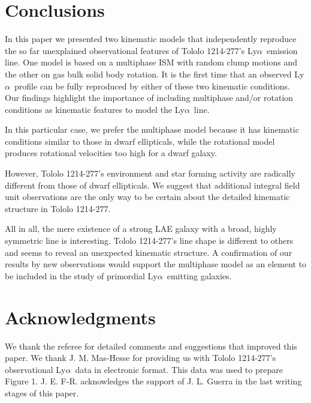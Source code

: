 \documentclass[a4,useAMS,usenatbib,usegraphicx]{mn2e}
\newcommand{\tol}{Tololo 1214-277}
\newcommand{\lya}{\ifmmode{{\rm Ly}\alpha}\else Ly$\alpha$\ \fi}
\begin{document}
\section{Conclusions}
\label{sec:conclusions}

In this paper we presented two kinematic models that independently
reproduce the so far unexplained observational features of \tol's
\lya emission line.
One model is based on a multiphase ISM with random clump motions and
the other on gas bulk solid body rotation. 
It is the first time that an observed \lya profile can be fully
reproduced by either of these two kinematic conditions.
Our findings highlight the importance of including multiphase and/or
rotation conditions as kinematic features to model the \lya line.

In this particular case, we prefer the multiphase model because it has kinematic
conditions similar to those in dwarf ellipticals, while the
rotational model produces rotational velocities too high for a dwarf
galaxy.  

However, \tol's environment and star forming activity are radically
different from those of dwarf ellipticals.
We suggest that additional integral field unit observations are the
only way to be certain about the detailed kinematic structure in \tol.

All in all, the mere existence of a strong LAE galaxy with a broad,
highly symmetric line is interesting. 
\tol's line shape is different to others and seems to reveal an
unexpected kinematic structure.
A confirmation of our results by new observations would support the multiphase model
as an element to be included in the study of primordial \lya emitting
galaxies.
 
\section*{Acknowledgments}
We thank the referee for detailed comments and suggestions that
improved this paper. 
We thank J. M. Mas-Hesse for providing us with \tol's observational
\lya data \citep{mashesse03} in electronic format. This data was
used to prepare Figure 1.
J. E. F-R. acknowledges the support of J. L. Guerra in the last
writing stages of this paper.



%
\end{document}
